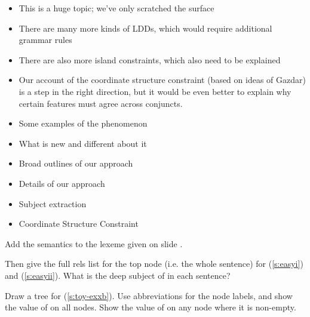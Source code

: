 \documentclass[a4paper,landscape,headrule,footrule]{foils}
\begin{document}
\begin{itemize}
\item This is a huge topic; we've only scratched the
surface
\item There are many more kinds of LDDs, which
would require additional grammar rules
\item There are also more island constraints, which also
need to be explained
\item Our account of the coordinate structure constraint
(based on ideas of Gazdar) is a step in the right
direction, but it would be even better to explain why certain
features must agree across conjuncts.
\end{itemize}


\begin{itemize}
\item Some examples of the phenomenon
\item What is new and different about it
\item Broad outlines of our approach
\item Details of our approach
\item Subject extraction
\item Coordinate Structure Constraint
\end{itemize}


Add the semantics to the lexeme  given on slide \pageref{l:easy}.

Then give the full rels list for the top node (i.e. the whole
sentence) for (\ref{s:easyi}) and (\ref{s:easyii}).  What is the deep
subject of  in each sentence?  

 \begin{exe}
    \ex \label{s:easyi}
    \ex \label{s:easyii}
  \end{exe}

Draw a tree for (\ref{s:toy-exxb}).  
Use abbreviations for the node labels, and show the value of 
on all nodes.  Show the value of  on any node where it is
non-empty.

\begin{exe}
  \ex \label{s:toy-exxb} 
\end{exe}
\end{document}

